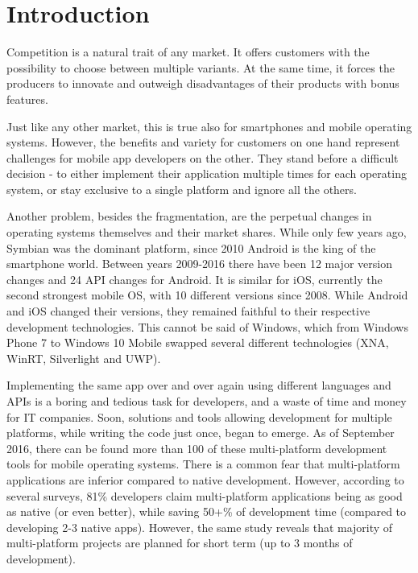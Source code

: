 \documentclass[english,master,public,dept460,male,cpdeclaration,oneside]{diploma}
\begin{document}
\MakeTitlePages


\section{Introduction}
Competition is a natural trait of any market. It offers customers with the possibility to choose between multiple variants. At the same time, it forces the producers to innovate and outweigh disadvantages of their products with bonus features. 

Just like any other market, this is true also for smartphones and mobile operating systems. However, the benefits and variety for customers on one hand represent challenges for mobile app developers on the other. They stand before a difficult decision - to either implement their application multiple times for each operating system, or stay exclusive to a single platform and ignore all the others.

Another problem, besides the fragmentation, are the perpetual changes in operating systems themselves and their market shares. While only few years ago, Symbian was the dominant platform, since 2010 Android is the king of the smartphone world. Between years 2009-2016 there have been 12 major version changes and 24 API changes for Android. It is similar for iOS, currently the second strongest mobile OS, with 10 different versions since 2008. While Android and iOS changed their versions, they remained faithful to their respective development technologies. This cannot be said of Windows, which from Windows Phone 7 to Windows 10 Mobile swapped several different technologies (XNA, WinRT, Silverlight and UWP).

Implementing the same app over and over again using different languages and APIs is a boring and tedious task for developers, and a waste of time and money for IT companies. Soon, solutions and tools allowing development for multiple platforms, while writing the code just once, began to emerge. As of September 2016, there can be found more than 100 of these multi-platform development tools for mobile operating systems. There is a common fear that multi-platform applications are inferior compared to native development. However, according to several surveys, 81\% developers claim multi-platform applications being as good as native (or even better), while saving 50+\% of development time (compared to developing 2-3 native apps)\cite{cptBenchmarking2014}. However, the same study reveals that majority of multi-platform projects are planned for short term (up to 3 months of development).
\end{document}
